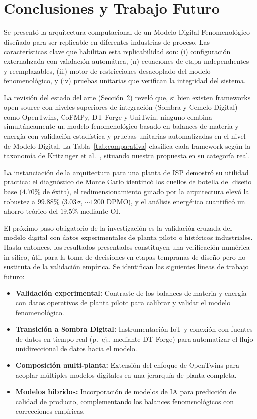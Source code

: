 \documentclass[10pt,letterpaper,twocolumn]{article}
\begin{document}
\section{Conclusiones y Trabajo Futuro}

Se presentó la arquitectura computacional de un Modelo Digital Fenomenológico diseñado para ser replicable en diferentes industrias de proceso. Las características clave que habilitan esta replicabilidad son: (i) configuración externalizada con validación automática, (ii) ecuaciones de etapa independientes y reemplazables, (iii) motor de restricciones desacoplado del modelo fenomenológico, y (iv) pruebas unitarias que verifican la integridad del sistema.

La revisión del estado del arte (Sección~2) reveló que, si bien existen frameworks open-source con niveles superiores de integraci\'on (Sombra y Gemelo Digital) como OpenTwins, CoFMPy, DT-Forge y UniTwin, ninguno combina simultáneamente un modelo fenomenológico basado en balances de materia y energía con validación estadística y pruebas unitarias automatizadas en el nivel de Modelo Digital. La Tabla~\ref{tab:comparativa} clasifica cada framework según la taxonomía de Kritzinger et al.~\cite{kritzinger2018digital}, situando nuestra propuesta en su categoría real.

La instanciación de la arquitectura para una planta de ISP demostró su utilidad práctica: el diagnóstico de Monte Carlo identificó los cuellos de botella del diseño base ($4.70\%$ de éxito), el redimensionamiento guiado por la arquitectura elevó la robustez a $99.88\%$ ($3.03\sigma$, $\sim1200$ DPMO), y el análisis energético cuantificó un ahorro teórico del $19.5\%$ mediante OI.

El pr\'oximo paso obligatorio de la investigaci\'on es la validaci\'on cruzada del modelo digital con datos experimentales de planta piloto o hist\'oricos industriales. Hasta entonces, los resultados presentados constituyen una verificaci\'on num\'erica in silico, \'util para la toma de decisiones en etapas tempranas de dise\~no pero no sustituta de la validaci\'on emp\'irica. Se identifican las siguientes líneas de trabajo futuro:

\begin{itemize}
    \item \textbf{Validaci\'on experimental:} Contraste de los balances de materia y energía con datos operativos de planta piloto para calibrar y validar el modelo fenomenológico.
    \item \textbf{Transici\'on a Sombra Digital:} Instrumentaci\'on IoT y conexi\'on con fuentes de datos en tiempo real (p.~ej., mediante DT-Forge) para automatizar el flujo unidireccional de datos hacia el modelo.
    \item \textbf{Composici\'on multi-planta:} Extensi\'on del enfoque de OpenTwins para acoplar m\'ultiples modelos digitales en una jerarqu\'ia de planta completa.
    \item \textbf{Modelos híbridos:} Incorporaci\'on de modelos de IA para predicci\'on de calidad de producto, complementando los balances fenomenol\'ogicos con correcciones emp\'iricas.
\end{itemize}
\end{document}
